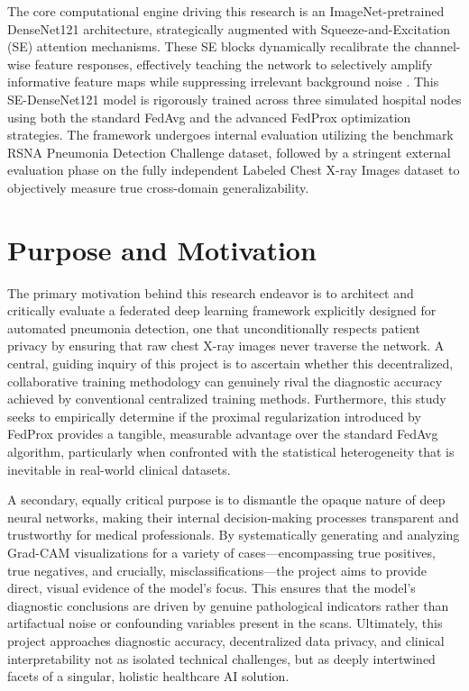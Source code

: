 \documentclass[12pt,a4paper]{report}
\begin{document}
The core computational engine driving this research is an ImageNet-pretrained DenseNet121 architecture, strategically augmented with Squeeze-and-Excitation (SE) attention mechanisms. These SE blocks dynamically recalibrate the channel-wise feature responses, effectively teaching the network to selectively amplify informative feature maps while suppressing irrelevant background noise \cite{hu2018squeeze}. This SE-DenseNet121 model is rigorously trained across three simulated hospital nodes using both the standard FedAvg and the advanced FedProx optimization strategies. The framework undergoes internal evaluation utilizing the benchmark RSNA Pneumonia Detection Challenge dataset, followed by a stringent external evaluation phase on the fully independent Labeled Chest X-ray Images dataset to objectively measure true cross-domain generalizability.

\section{Purpose and Motivation}

The primary motivation behind this research endeavor is to architect and critically evaluate a federated deep learning framework explicitly designed for automated pneumonia detection, one that unconditionally respects patient privacy by ensuring that raw chest X-ray images never traverse the network. A central, guiding inquiry of this project is to ascertain whether this decentralized, collaborative training methodology can genuinely rival the diagnostic accuracy achieved by conventional centralized training methods. Furthermore, this study seeks to empirically determine if the proximal regularization introduced by FedProx provides a tangible, measurable advantage over the standard FedAvg algorithm, particularly when confronted with the statistical heterogeneity that is inevitable in real-world clinical datasets.

A secondary, equally critical purpose is to dismantle the opaque nature of deep neural networks, making their internal decision-making processes transparent and trustworthy for medical professionals. By systematically generating and analyzing Grad-CAM visualizations for a variety of cases---encompassing true positives, true negatives, and crucially, misclassifications---the project aims to provide direct, visual evidence of the model's focus. This ensures that the model's diagnostic conclusions are driven by genuine pathological indicators rather than artifactual noise or confounding variables present in the scans. Ultimately, this project approaches diagnostic accuracy, decentralized data privacy, and clinical interpretability not as isolated technical challenges, but as deeply intertwined facets of a singular, holistic healthcare AI solution.
\end{document}
